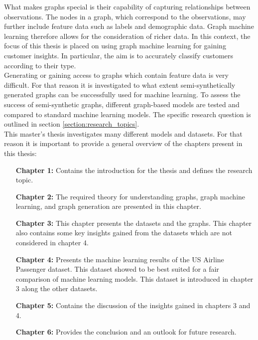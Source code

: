 	\noindent What makes graphs special is their capability of capturing
	relationships between observations. The nodes in a graph, which correspond
	to the observations, may further include feature data such as labels and
	demographic data. Graph machine learning therefore allows for the
	consideration of richer data. In this context, the focus of this thesis is 
	placed on using graph machine learning for gaining customer insights. In
	particular, the aim is to accurately classify customers according to their
	type. \\

	\noindent Generating or gaining access to graphs which contain feature data 
	is very difficult. For that reason it is investigated to what extent
	semi-synthetically generated graphs can be successfully used for machine 
	learning. To assess the success of semi-synthetic graphs, different
	graph-based models are tested and compared to standard machine learning
	models. The specific research question is outlined in section
	\ref{section:research_topics}. \\

	\noindent This master's thesis investigates many different models and
	datasets. For that reason it is important to provide a general overview of
	the chapters present in this thesis:

	\begin{itemize}[leftmargin=1.0in] 
		\item[\textbf{Chapter 1:}] Contains the introduction for the thesis and defines
			the research topic.
		\item[\textbf{Chapter 2:}] The required theory for understanding
			graphs, graph machine learning, and graph generation are presented
			in this chapter.
		\item[\textbf{Chapter 3:}] This chapter presents the datasets and the graphs.
			This chapter also contains some key insights gained from the 
			datasets which are not considered in chapter 4.
		\item[\textbf{Chapter 4:}] Presents the machine learning results of the US Airline 
			Passenger dataset. This dataset showed to be best suited for a
			fair comparison of machine learning models. This dataset is 
			introduced in chapter 3 along the other datasets.
		\item[\textbf{Chapter 5:}]  Contains the discussion of the insights gained in
			chapters 3 and 4.
		\item[\textbf{Chapter 6:}] Provides the conclusion and an outlook for future
			research.
	\end{itemize}

